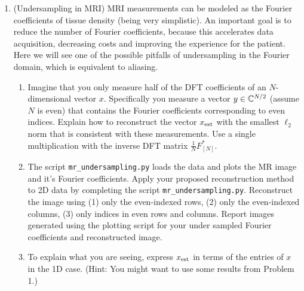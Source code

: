 \documentclass[12pt,twoside]{article}
\begin{document}
\begin{enumerate}
  \item (Undersampling in MRI) MRI measurements can be modeled as the Fourier coefficients of tissue density (being very simplistic). An important goal is to reduce the number of Fourier coefficients, because this accelerates data acquisition, decreasing costs and improving the experience for the patient. Here we will see one of the possible pitfalls of undersampling in the Fourier domain, which is equivalent to aliasing.
 \begin{enumerate}
 \item Imagine that you only measure half of the DFT coefficients of an $N$-dimensional vector $x$.  Specifically you measure a vector $y \in \mathbb{C}^{N/2}$ (assume $N$ is even) that contains the Fourier coefficients corresponding to even indices. Explain how to reconstruct the vector $x_{\operatorname{est}}$ with the smallest $\ell_2$ norm that is consistent with these measurements. Use a single multiplication with the inverse DFT matrix $\frac{1}{N}F_{[N]}^{\ast}$.
 \item The script  \texttt{mr\_undersampling.py} loads the data and plots the MR image and it's Fourier coefficients. Apply your proposed reconstruction method to 2D data by completing the script \texttt{mr\_undersampling.py}.  Reconstruct the image using (1) only the even-indexed rows, (2) only the even-indexed columns, (3) only indices in even rows and columns. Report images generated using the plotting script for your under sampled Fourier coefficients and reconstructed image.  
  \item To explain what you are seeing, express $x_{\operatorname{est}}$ in terms of the entries of $x$ in the 1D case. (Hint: You might want to use some results from Problem 1.)
  \end{enumerate}

 \end{enumerate}
\end{document}
